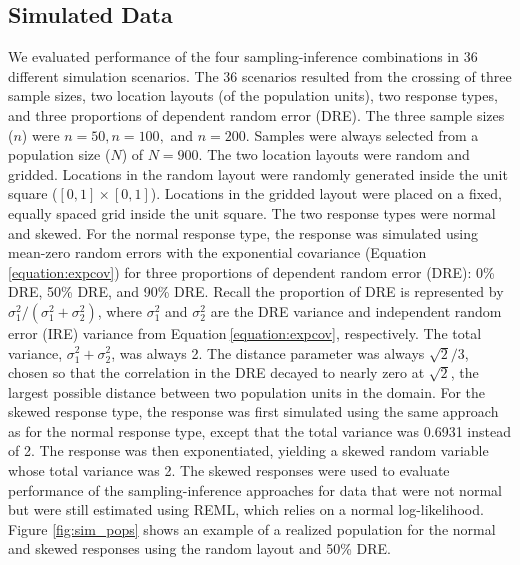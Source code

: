 \documentclass[]{elsarticle} %
\begin{document}
\hypertarget{sec:mm_sim}{%
\subsection{Simulated Data}\label{sec:mm_sim}}

We evaluated performance of the four sampling-inference combinations in
36 different simulation scenarios. The 36 scenarios resulted from the
crossing of three sample sizes, two location layouts (of the population
units), two response types, and three proportions of dependent random
error (DRE). The three sample sizes (\(n\)) were \(n = 50, n = 100,\)
and \(n = 200\). Samples were always selected from a population size
(\(N\)) of \(N = 900\). The two location layouts were random and
gridded. Locations in the random layout were randomly generated inside
the unit square (\([0, 1] \times [0, 1]\)). Locations in the gridded
layout were placed on a fixed, equally spaced grid inside the unit
square. The two response types were normal and skewed. For the normal
response type, the response was simulated using mean-zero random errors
with the exponential covariance (Equation\(~\)\ref{equation:expcov}) for
three proportions of dependent random error (DRE): 0\% DRE, 50\% DRE,
and 90\% DRE. Recall the proportion of DRE is represented by
\(\sigma^2_1 / (\sigma^2_1 + \sigma^2_2)\), where \(\sigma^2_1\) and
\(\sigma^2_2\) are the DRE variance and independent random error (IRE)
variance from Equation\(~\)\ref{equation:expcov}, respectively. The
total variance, \(\sigma^2_1 + \sigma^2_2\), was always 2. The distance
parameter was always \(\sqrt{2} / 3\), chosen so that the correlation in
the DRE decayed to nearly zero at \(\sqrt{2}\), the largest possible
distance between two population units in the domain. For the skewed
response type, the response was first simulated using the same approach
as for the normal response type, except that the total variance was
0.6931 instead of 2. The response was then exponentiated, yielding a
skewed random variable whose total variance was 2. The skewed responses
were used to evaluate performance of the sampling-inference approaches
for data that were not normal but were still estimated using REML, which
relies on a normal log-likelihood. Figure \ref{fig:sim_pops} shows an
example of a realized population for the normal and skewed responses
using the random layout and 50\% DRE.
\end{document}
